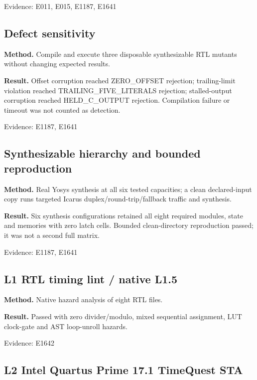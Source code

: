 \documentclass[11pt,a4paper]{article}
\begin{document}
{\small Evidence: E011,\allowbreak{} E015,\allowbreak{} E1187,\allowbreak{} E1641}

\subsection{Defect sensitivity}

\textbf{Method.} Compile and execute three disposable synthesizable RTL mutants without changing expected results.

\textbf{Result.} Offset corruption reached ZERO\_\allowbreak{}OFFSET rejection; trailing-limit violation reached TRAILING\_\allowbreak{}FIVE\_\allowbreak{}LITERALS rejection; stalled-output corruption reached HELD\_\allowbreak{}C\_\allowbreak{}OUTPUT rejection. Compilation failure or timeout was not counted as detection.

{\small Evidence: E1187,\allowbreak{} E1641}

\subsection{Synthesizable hierarchy and bounded reproduction}

\textbf{Method.} Real Yosys synthesis at all six tested capacities; a clean declared-input copy runs targeted Icarus duplex/\allowbreak{}round-trip/\allowbreak{}fallback traffic and synthesis.

\textbf{Result.} Six synthesis configurations retained all eight required modules,\allowbreak{} state and memories with zero latch cells. Bounded clean-directory reproduction passed; it was not a second full matrix.

{\small Evidence: E1187,\allowbreak{} E1641}

\subsection{L1 RTL timing lint /\allowbreak{} native L1.5}

\textbf{Method.} Native hazard analysis of eight RTL files.

\textbf{Result.} Passed with zero divider/\allowbreak{}modulo,\allowbreak{} mixed sequential assignment,\allowbreak{} LUT clock-gate and AST loop-unroll hazards.

{\small Evidence: E1642}

\subsection{L2 Intel Quartus Prime 17.1 TimeQuest STA}
\end{document}
